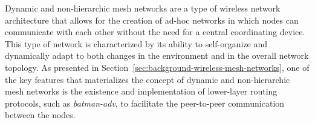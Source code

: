 Dynamic and non-hierarchic mesh networks are a type of wireless network architecture that allows for the creation of ad-hoc networks in which nodes can communicate with each other without the need for a central coordinating device. This type of network is characterized by its ability to self-organize and dynamically adapt to both changes in the environment and in the overall network topology. As presented in Section~\ref{sec:background-wireless-mesh-networks}, one of the key features that materializes the concept of dynamic and non-hierarchic mesh networks is the existence and implementation of lower-layer routing protocols, such as \emph{batman-adv}, to facilitate the peer-to-peer communication between the nodes.

